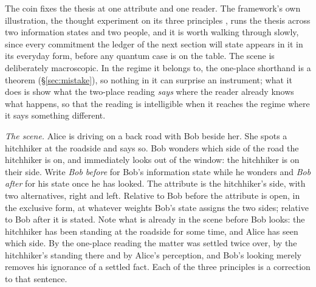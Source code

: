 The coin fixes the thesis at one attribute and one reader. The framework's own illustration, the thought experiment on its three principles \cite{Aethus}, runs the thesis across two information states and two people, and it is worth walking through slowly, since every commitment the ledger of the next section will state appears in it in its everyday form, before any quantum case is on the table. The scene is deliberately macroscopic. In the regime it belongs to, the one-place shorthand is a theorem (\S\ref{sec:mistake}), so nothing in it can surprise an instrument; what it does is show what the two-place reading \emph{says} where the reader already knows what happens, so that the reading is intelligible when it reaches the regime where it says something different.

\textit{The scene.} Alice is driving on a back road with Bob beside her. She spots a hitchhiker at the roadside and says so. Bob wonders which side of the road the hitchhiker is on, and immediately looks out of the window: the hitchhiker is on their side. Write \emph{Bob before} for Bob's information state while he wonders and \emph{Bob after} for his state once he has looked. The attribute is the hitchhiker's side, with two alternatives, right and left. Relative to Bob before the attribute is open, in the exclusive form, at whatever weights Bob's state assigns the two sides; relative to Bob after it is stated. Note what is already in the scene before Bob looks: the hitchhiker has been standing at the roadside for some time, and Alice has seen which side. By the one-place reading the matter was settled twice over, by the hitchhiker's standing there and by Alice's perception, and Bob's looking merely removes his ignorance of a settled fact. Each of the three principles is a correction to that sentence.

